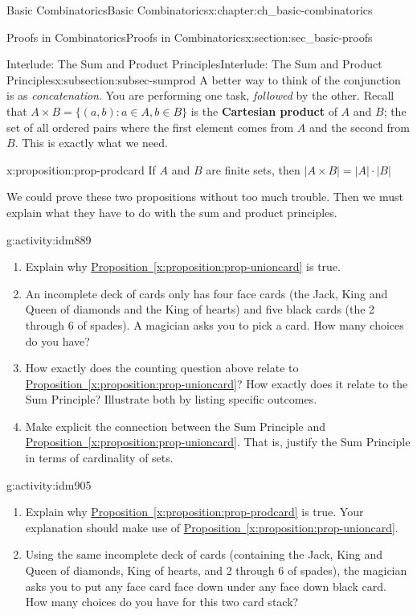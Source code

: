 \documentclass[oneside,10pt,]{book}
\newcommand{\terminology}[1]{\textbf{#1}}
\numberwithin{equation}{chapter}
\def\st{:}
\newcommand{\card}[1]{\left| #1 \right|}
\begin{document}
\begin{chapterptx}{Basic Combinatorics}{}{Basic Combinatorics}{}{}{x:chapter:ch_basic-combinatorics}
\begin{sectionptx}{Proofs in Combinatorics}{}{Proofs in Combinatorics}{}{}{x:section:sec_basic-proofs}
\begin{subsectionptx}{Interlude: The Sum and Product Principles}{}{Interlude: The Sum and Product Principles}{}{}{x:subsection:subsec-sumprod}
A better way to think of the conjunction is as \emph{concatenation}.  You are performing one task, \emph{followed} by the other.  Recall that \(A \times B = \{(a,b) \st a \in A, b \in B\}\) is the \terminology{Cartesian product} of \(A\) and \(B\); the set of all ordered pairs where the first element comes from \(A\) and the second from \(B\).  This is exactly what we need.%
\begin{proposition}{}{}{x:proposition:prop-prodcard}%
If \(A\) and \(B\) are finite sets, then \(\card{A \times B} = \card{A} \cdot \card{B}\)%
\end{proposition}
We could prove these two propositions without too much trouble.  Then we must explain what they have to do with the sum and product principles.%
\begin{activity}{}{g:activity:idm889}%
\begin{enumerate}[font=\bfseries,label=(\alph*),ref=\alph*]
\item{}Explain why \hyperref[x:proposition:prop-unioncard]{Proposition~\ref{x:proposition:prop-unioncard}} is true.%
\item{}An incomplete deck of cards only has four face cards (the Jack, King and Queen of diamonds and the King of hearts) and five black cards (the 2 through 6 of spades).  A magician asks you to pick a card.  How many choices do you have?%
\item{}How exactly does the counting question above relate to \hyperref[x:proposition:prop-unioncard]{Proposition~\ref{x:proposition:prop-unioncard}}?  How exactly does it relate to the Sum Principle?  Illustrate both by listing specific outcomes.%
\item{}Make explicit the connection between the Sum Principle and \hyperref[x:proposition:prop-unioncard]{Proposition~\ref{x:proposition:prop-unioncard}}.  That is, justify the Sum Principle in terms of cardinality of sets.%
\end{enumerate}
\end{activity}
\begin{activity}{}{g:activity:idm905}%
\begin{enumerate}[font=\bfseries,label=(\alph*),ref=\alph*]
\item{}Explain why \hyperref[x:proposition:prop-prodcard]{Proposition~\ref{x:proposition:prop-prodcard}} is true.  Your explanation should make use of \hyperref[x:proposition:prop-unioncard]{Proposition~\ref{x:proposition:prop-unioncard}}.%
\item{}Using the same incomplete deck of cards (containing the Jack, King and Queen of diamonds, King of hearts, and 2 through 6 of spades), the magician asks you to put any face card face down under any face down black card.  How many choices do you have for this two card stack?%

\end{enumerate}
\end{activity}
\end{subsectionptx}
\end{sectionptx}
\end{chapterptx}
\end{document}
